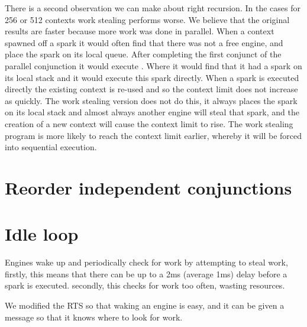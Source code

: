 There is a second observation we can make about right recursion.
In the cases for 256 or 512 contexts work stealing performs worse.
We believe that the original results are faster because more work was done
in parallel.
When a context spawned off a spark it would often find that there was not a
free engine, and place the spark on its local queue.
After completing the first conjunct of the parallel conjunction it would
execute \joinandcontinue.
Where it would find that it had a spark on its local stack and it would
execute this spark directly.
When a spark is executed directly the existing context is re-used and so the
context limit does not increase as quickly.
The work stealing version does not do this,
it always places the spark on its local stack and almost always
another engine will steal that spark,
and the creation of a new context will cause the context limit to rise.
The work stealing program is more likely to reach the context limit earlier,
whereby it will be forced into sequential execution.

\section{Reorder independent conjunctions}



\section{Idle loop}
\label{sec:idle_loop}

Engines wake up and periodically check for work by attempting to
steal work,
firstly, this means that there can be up to a 2ms (average 1ms) delay before
a spark is executed.
secondly, this checks for work too often, wasting resources.

We modified the RTS so that waking an engine is easy, and it can be given a
message so that it knows where to look for work.



